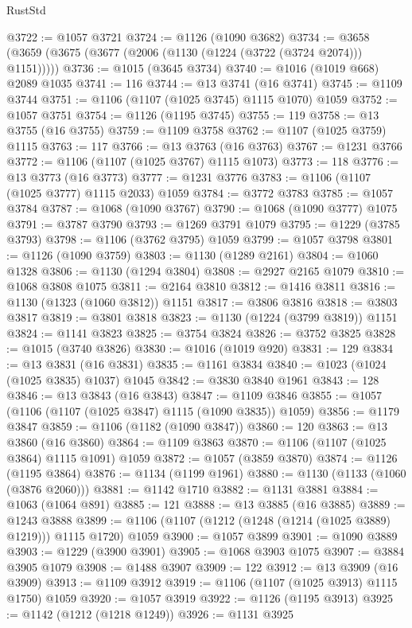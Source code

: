 \begin{lexlean}{RustStd}
\begin{coremodule}
@3722 := @1057 @3721
@3724 := @1126 (@1090 @3682)
@3734 := @3658 (@3659 (@3675 (@3677 (@2006 (@1130 (@1224 (@3722 (@3724 @2074))) @1151)))))
@3736 := @1015 (@3645 @3734)
@3740 := @1016 (@1019 @668) @2089 @1035
@3741 := 116
@3744 := @13 @3741 (@16 @3741)
@3745 := @1109 @3744
@3751 := @1106 (@1107 (@1025 @3745) @1115 @1070) @1059
@3752 := @1057 @3751
@3754 := @1126 (@1195 @3745)
@3755 := 119
@3758 := @13 @3755 (@16 @3755)
@3759 := @1109 @3758
@3762 := @1107 (@1025 @3759) @1115
@3763 := 117
@3766 := @13 @3763 (@16 @3763)
@3767 := @1231 @3766
@3772 := @1106 (@1107 (@1025 @3767) @1115 @1073)
@3773 := 118
@3776 := @13 @3773 (@16 @3773)
@3777 := @1231 @3776
@3783 := @1106 (@1107 (@1025 @3777) @1115 @2033) @1059
@3784 := @3772 @3783
@3785 := @1057 @3784
@3787 := @1068 (@1090 @3767)
@3790 := @1068 (@1090 @3777) @1075
@3791 := @3787 @3790
@3793 := @1269 @3791 @1079
@3795 := @1229 (@3785 @3793)
@3798 := @1106 (@3762 @3795) @1059
@3799 := @1057 @3798
@3801 := @1126 (@1090 @3759)
@3803 := @1130 (@1289 @2161)
@3804 := @1060 @1328
@3806 := @1130 (@1294 @3804)
@3808 := @2927 @2165 @1079
@3810 := @1068 @3808 @1075
@3811 := @2164 @3810
@3812 := @1416 @3811
@3816 := @1130 (@1323 (@1060 @3812)) @1151
@3817 := @3806 @3816
@3818 := @3803 @3817
@3819 := @3801 @3818
@3823 := @1130 (@1224 (@3799 @3819)) @1151
@3824 := @1141 @3823
@3825 := @3754 @3824
@3826 := @3752 @3825
@3828 := @1015 (@3740 @3826)
@3830 := @1016 (@1019 @920)
@3831 := 129
@3834 := @13 @3831 (@16 @3831)
@3835 := @1161 @3834
@3840 := @1023 (@1024 (@1025 @3835) @1037) @1045
@3842 := @3830 @3840 @1961
@3843 := 128
@3846 := @13 @3843 (@16 @3843)
@3847 := @1109 @3846
@3855 := @1057 (@1106 (@1107 (@1025 @3847) @1115 (@1090 @3835)) @1059)
@3856 := @1179 @3847
@3859 := @1106 (@1182 (@1090 @3847))
@3860 := 120
@3863 := @13 @3860 (@16 @3860)
@3864 := @1109 @3863
@3870 := @1106 (@1107 (@1025 @3864) @1115 @1091) @1059
@3872 := @1057 (@3859 @3870)
@3874 := @1126 (@1195 @3864)
@3876 := @1134 (@1199 @1961)
@3880 := @1130 (@1133 (@1060 (@3876 @2060)))
@3881 := @1142 @1710
@3882 := @1131 @3881
@3884 := @1063 (@1064 @891)
@3885 := 121
@3888 := @13 @3885 (@16 @3885)
@3889 := @1243 @3888
@3899 := @1106 (@1107 (@1212 (@1248 (@1214 (@1025 @3889) @1219))) @1115 @1720) @1059
@3900 := @1057 @3899
@3901 := @1090 @3889
@3903 := @1229 (@3900 @3901)
@3905 := @1068 @3903 @1075
@3907 := @3884 @3905 @1079
@3908 := @1488 @3907
@3909 := 122
@3912 := @13 @3909 (@16 @3909)
@3913 := @1109 @3912
@3919 := @1106 (@1107 (@1025 @3913) @1115 @1750) @1059
@3920 := @1057 @3919
@3922 := @1126 (@1195 @3913)
@3925 := @1142 (@1212 (@1218 @1249))
@3926 := @1131 @3925

\end{coremodule}
\end{lexlean}
